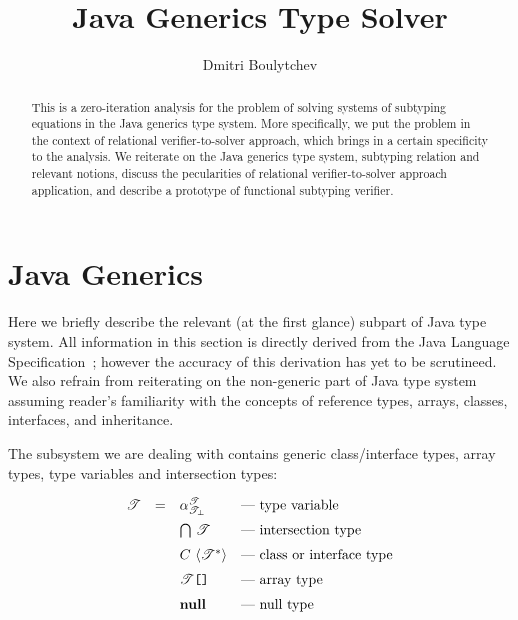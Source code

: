 \documentclass{article}
\newcommand{\grc}[2]{{#1}\,\left<{#2}\right>}
\newcommand{\java}[1]{\texttt{#1}}
\newcommand{\primi}[1]{\mathbf{#1}}
\begin{document}
\title{Java Generics Type Solver}

\author{Dmitri Boulytchev}

\maketitle

\begin{abstract}
  This is a zero-iteration analysis for the problem of solving systems of subtyping
  equations in the Java generics type system. More specifically, we put the
  problem in the context of relational verifier-to-solver approach, which brings in a certain
  specificity to the analysis. We reiterate on the Java generics type system, subtyping
  relation and relevant notions, discuss the pecularities of relational verifier-to-solver
  approach application, and describe a prototype of functional subtyping verifier.
\end{abstract}

\section{Java Generics}

Here we briefly describe the relevant (at the first glance) subpart of Java type system. All
information in this section is directly derived from the Java Language Specification~\cite{JLS};
however the accuracy of this derivation has yet to be scrutineed. We also refrain from
reiterating on the non-generic part of Java type system assuming reader's familiarity with the
concepts of reference types, arrays, classes, interfaces, and inheritance.

The subsystem we are dealing with contains generic class/interface types, array types,
type variables and intersection types:

\[
\begin{array}{rcll}
  \mathscr{T} & = & \alpha^\mathscr{T}_\mathscr{T_\bot}&\mbox{--- type variable}\\[2mm]
              &   & \bigcap\,\mathscr{T}           &\mbox{--- intersection type}\\[2mm]
              &   & \grc{C}{\mathscr{T}^*}         &\mbox{--- class or interface type}\\[2mm]
              &   & \mathscr{T}\mbox{\java{[]}}    &\mbox{--- array type}\\[2mm]
              &   & \primi{null}                   &\mbox{--- null type}\\[2mm]
\end{array}
\]
\end{document}
